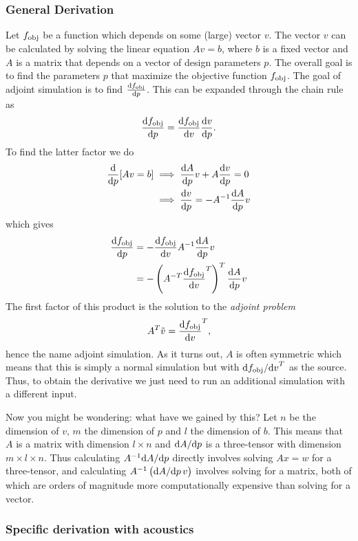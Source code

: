 \subsubsection{General Derivation}\label{sec:general_derivation}

Let $f_\text{obj}$ be a function which depends on some (large) vector $v$.
The vector $v$ can be calculated by solving the linear equation
$A v = b$, where $b$ is a fixed vector and $A$ is a matrix that depends on a
vector of design parameters $p$.
The overall goal is to find the parameters $p$ that maximize the objective
function $f_\text{obj}$.
The goal of adjoint simulation is to find $\diff{\fobj}{p}$.
This can be expanded through the chain rule as
\[
	\diff{\fobj}{p} = \diff{\fobj}{v} \diff{v}{p}.
\]
To find the latter factor we do
\begin{align*}
	\diff{}{p} [Av = b] &\implies \diff{A}{p} v + A \diff{v}{p} = 0\\
						&\implies \diff{v}{p} = -A^{-1} \diff{A}{p} v
\end{align*}
which gives
\begin{align}
	\diff{\fobj}{p} &= - \diff{\fobj}{v} A^{-1} \diff{A}{p}
	v\label{eq:no_adj_sim}\\
	&= - \left(A^{-T} \diff{\fobj}{v}^T \right)^T \diff{A}{p} v
\end{align}
The first factor of this product is the solution to the \emph{adjoint problem}
\begin{equation}
	A^T \tilde v = \diff{\fobj}{v}^T,
\end{equation}
hence the name adjoint simulation.
As it turns out, $A$ is often symmetric which means that this is simply a normal
simulation but with $\difs{\fobj}{v}^T$ as the source.
Thus, to obtain the derivative we just need to run an additional
simulation with a different input.

Now you might be wondering: what have we gained by this?
Let $n$ be the dimension of $v$, $m$ the dimension of $p$ and $l$ the dimension
of $b$.
This means that $A$ is a matrix with dimension $l\times n$ and $\difs{A}{p}$ is
a three-tensor with dimension $m\times l\times n$.
Thus calculating $A^{-1} \difs{A}{p}$ directly involves solving $Ax = w$ for a
three-tensor, and calculating $A^{-1} \left(\difs{A}{p}\,v\right)$
involves solving for a matrix, both of which are orders of magnitude more
computationally expensive than solving for a vector.

\subsubsection{Specific derivation with acoustics}

